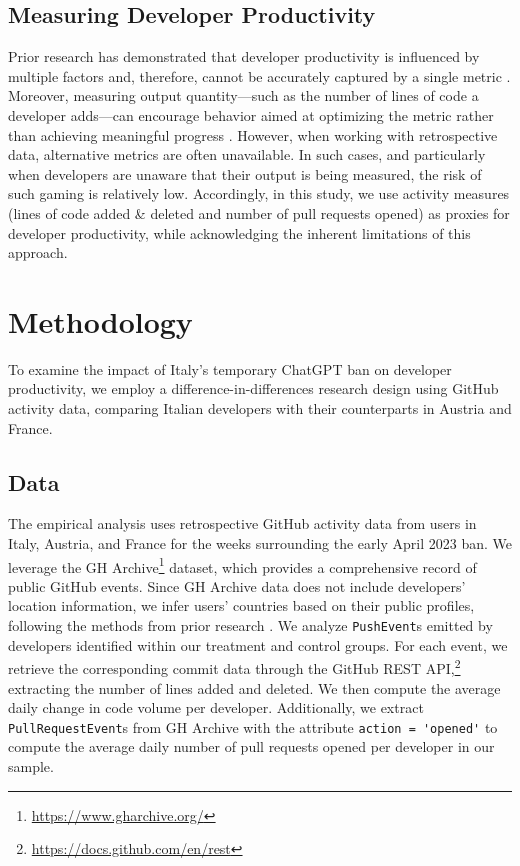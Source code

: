 \subsection{Measuring Developer Productivity}

Prior research has demonstrated that developer productivity is influenced by multiple factors and, therefore, cannot be accurately captured by a single metric \cite[pp.~47--48]{forsgren2021the}. Moreover, measuring output quantity---such as the number of lines of code a developer adds---can encourage behavior aimed at optimizing the metric rather than achieving meaningful progress \cite[p.~60]{ziegler2024measuring}. However, when working with retrospective data, alternative metrics are often unavailable. In such cases, and particularly when developers are unaware that their output is being measured, the risk of such gaming is relatively low. Accordingly, in this study, we use activity measures (lines of code added \& deleted and number of pull requests opened) as proxies for developer productivity, while acknowledging the inherent limitations of this approach.

\section{Methodology}

To examine the impact of Italy's temporary ChatGPT ban on developer productivity, we employ a difference-in-differences research design using GitHub activity data, comparing Italian developers with their counterparts in Austria and France.

\subsection{Data}

The empirical analysis uses retrospective GitHub activity data from users in Italy, Austria, and France for the weeks surrounding the early April 2023 ban. We leverage the GH Archive\footnote{\url{https://www.gharchive.org/}} dataset, which provides a comprehensive record of public GitHub events. Since GH Archive data does not include developers' location information, we infer users' countries based on their public profiles, following the methods from prior research \cite[p.~5]{Kreitmeir2023}. We analyze \verb|PushEvent|s emitted by developers identified within our treatment and control groups. For each event, we retrieve the corresponding commit data through the GitHub REST API,\footnote{\url{https://docs.github.com/en/rest}} extracting the number of lines added and deleted. We then compute the average daily change in code volume per developer. Additionally, we extract \verb|PullRequestEvent|s from GH Archive with the attribute \verb|action = 'opened'| to compute the average daily number of pull requests opened per developer in our sample.


